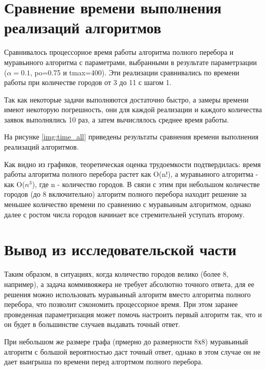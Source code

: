 \section{Сравнение времени выполнения реализаций алгоритмов}

Сравнивалось процессорное время работы алгоритма полного перебора и муравьиного алгоритма с параметрами, выбранными в результате параметрзации ($\alpha=0.1$, po=0.75 и tmax=400). Эти реализации сравнивались по времени работы при количестве городов от 3 до 11 с шагом 1.
 
Так как некоторые задачи выполняются достаточно быстро, а замеры времени имеют некоторую погрешность, они для каждой реализации и каждого количества заявок выполнялись 10 раз, а затем вычислялось среднее время работы.
 

На рисунке \ref{img:time_all} приведены результаты сравнения времени выполнения реализаций алгоритмов. 

\clearpage
{}

Как видно из графиков, теоретическая оценка трудоемкости подтвердилась: время работы алгоритма полного перебора растет как O(n!), а муравьиного алгоритма - как O($n^3$), где n - количество городов. В связи с этим при небольшом количестве городов (до 8 включительно) алгоритм полного перебора находит решение за меньшее количество времени по сравнению с муравьиным алгоритмом, однако далее с ростом числа городов начинает все стремительней уступать второму.


\section{Вывод из исследовательской части}

Таким образом, в ситуациях, когда количество городов велико (более 8, например), а задача коммивояжера не требует абсолютно точного ответа, для ее решения можно использовать муравьиный алгоритм вместо алгоритма полного перебора, что позволит сэкономить процессорное время. При этом заранее проведенная параметризация может помочь настроить первый алгоритм так, что и он будет в большинстве случаев выдавать точный ответ. 

При небольшом же размере графа (прмерно до размерности 8х8) муравьиный алгоритм с большой вероятностью даст точный ответ, однако в этом случае он не дает выигрыша по времени перед алгортмом полного перебора.